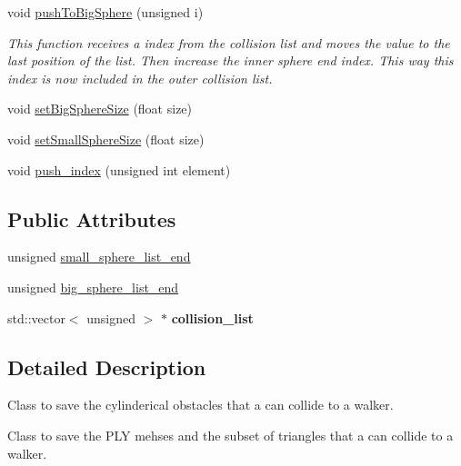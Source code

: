 \begin{DoxyCompactItemize}
\mbox{\label{class_cylinder_collision_sphere_a8742564f85c9fede195ee716a3b16042}} 
void \hyperlink{class_cylinder_collision_sphere_a8742564f85c9fede195ee716a3b16042}{push\+To\+Big\+Sphere} (unsigned i)
\begin{DoxyCompactList}\small\item\em This function receives a index from the collision list and moves the value to the last position of the list. Then increase the inner sphere end index. This way this index is now included in the outer collision list. \end{DoxyCompactList}\item 
void \hyperlink{class_cylinder_collision_sphere_a3fe165c817a66074e737985efd87128b}{set\+Big\+Sphere\+Size} (float size)
\item 
void \hyperlink{class_cylinder_collision_sphere_a6e7f5ff8f4e5c076edb5f1cbee433a34}{set\+Small\+Sphere\+Size} (float size)
\item 
void \hyperlink{class_cylinder_collision_sphere_af2977e3da60e7a4c1e4ae4fccf03ed09}{push\+\_\+index} (unsigned int element)
\end{DoxyCompactItemize}
\subsection*{Public Attributes}
\begin{DoxyCompactItemize}
\item 
unsigned \hyperlink{class_cylinder_collision_sphere_a89e3bdfa12042aa94c20949587c513d5}{small\+\_\+sphere\+\_\+list\+\_\+end}
\item 
unsigned \hyperlink{class_cylinder_collision_sphere_a303b3843a9c8ab9ae3e6f4cce85ae8e0}{big\+\_\+sphere\+\_\+list\+\_\+end}
\item 
\mbox{\label{class_cylinder_collision_sphere_a2c925c436410847d2f6079cd5331eada}} 
std\+::vector$<$ unsigned $>$ $\ast$ {\bfseries collision\+\_\+list}
\end{DoxyCompactItemize}


\subsection{Detailed Description}
Class to save the cylinderical obstacles that a can collide to a walker. 

Class to save the P\+LY mehses and the subset of triangles that a can collide to a walker. 

